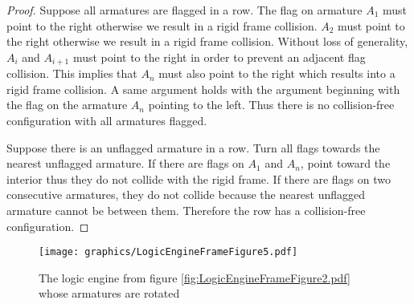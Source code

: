 \begin{proof}

Suppose all armatures are flagged in a row.  The flag on armature $A_1$ must point to the 
right otherwise we result in a rigid frame collision.  $A_2$ must point to the right otherwise 
we result in a rigid frame collision.  Without loss of generality, $A_i$ and $A_{i+1}$ must 
point to the right in order to prevent an adjacent flag collision.  This implies that $A_n$ 
must also point to the right which results into a rigid frame collision.
A same argument holds with the argument beginning with the flag 
on the armature $A_n$ pointing to the left.  Thus there is no collision-free configuration with 
all 
armatures flagged.


Suppose there is an unflagged armature in a row.  Turn all flags towards the nearest unflagged 
armature.  If there are flags on $A_1$ and $A_n$, point toward the interior thus they do not 
collide with the 
rigid frame.  If there are flags on two consecutive armatures, they do not collide because the 
nearest unflagged armature cannot be between them.  Therefore the row has a collision-free 
configuration.
\end{proof}

\begin{figure}[!htbp]
\begin{center}
\texttt{[image: graphics/LogicEngineFrameFigure5.pdf]}
\caption{The logic engine from figure \ref{fig:LogicEngineFrameFigure2.pdf} whose armatures are rotated}\label{fig:LogicEngineFrameFigure5.pdf}
\end{center}
\end{figure}


